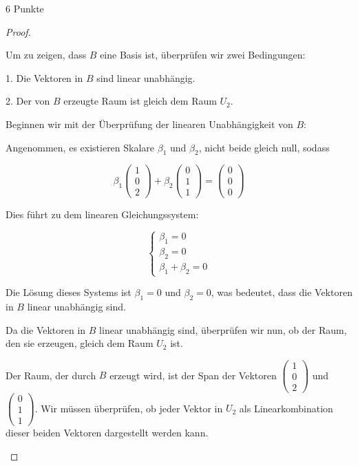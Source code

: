 \documentclass{../problemset}
\begin{document}
\begin{problem}{6 Punkte}
\begin{proof}
\begin{enumerate}
		      Um zu zeigen, dass $B$ eine Basis ist, überprüfen wir zwei Bedingungen:

		      1. Die Vektoren in $B$ sind linear unabhängig.

		      2. Der von $B$ erzeugte Raum ist gleich dem Raum $U_2$.

		      Beginnen wir mit der Überprüfung der linearen Unabhängigkeit von $B$:

		      Angenommen, es existieren Skalare $\beta_1$ und $\beta_2$, nicht beide gleich null, sodass

		      \[
			      \beta_1 \begin{pmatrix} 1 \\ 0 \\ 2 \end{pmatrix} + \beta_2 \begin{pmatrix} 0 \\ 1 \\ 1 \end{pmatrix} = \begin{pmatrix} 0 \\ 0 \\ 0 \end{pmatrix}
		      \]

		      Dies führt zu dem linearen Gleichungssystem:

		      \[
			      \begin{cases}
				      \beta_1 = 0 \\
				      \beta_2 = 0 \\
				      \beta_1 + \beta_2 = 0
			      \end{cases}
		      \]

		      Die Lösung dieses Systems ist $\beta_1 = 0$ und $\beta_2 = 0$, was bedeutet, dass die Vektoren in $B$ linear unabhängig sind.

		      Da die Vektoren in $B$ linear unabhängig sind, überprüfen wir nun, ob der Raum, den sie erzeugen, gleich dem Raum $U_2$ ist.

		      Der Raum, der durch $B$ erzeugt wird, ist der Span der Vektoren $\begin{pmatrix} 1 \\ 0 \\ 2 \end{pmatrix}$ und $\begin{pmatrix} 0 \\ 1 \\ 1 \end{pmatrix}$. Wir müssen überprüfen, ob jeder Vektor in $U_2$ als Linearkombination dieser beiden Vektoren dargestellt werden kann.


\end{enumerate}
\end{proof}
\end{problem}
\end{document}
